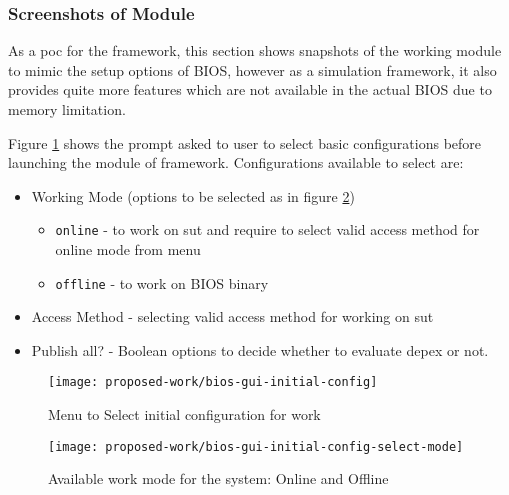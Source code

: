 \subsubsection{Screenshots of Module}
As a \gls{poc} for the framework, this section shows snapshots of the working module to mimic the setup options of BIOS, however as a simulation framework, it also provides quite more features which are not available in the actual BIOS due to memory limitation.

Figure \ref{fig:proposed-work-bios-gui-initial-config} shows the prompt asked to user to select basic configurations before launching the module of framework. Configurations available to select are:

\begin{itemize}
	\item Working Mode (options to be selected as in figure \ref{fig:proposed-work-bios-gui-initial-config-select-mode})
	\begin{itemize}
		\item \verb|online| - to work on \gls{sut} and require to select valid access method for online mode from menu
		\item \verb|offline| - to work on BIOS binary
	\end{itemize}
	\item Access Method - selecting valid access method for working on \gls{sut}
	\item Publish all? - Boolean options to decide whether to evaluate \gls{depex} or not.
\end{itemize}

\begin{figure}[!htbp]
	\centering
	\texttt{[image: proposed-work/bios-gui-initial-config]}
	\caption{Menu to Select initial configuration for work}\label{fig:proposed-work-bios-gui-initial-config}
\end{figure}

\begin{figure}[!htbp]
	\centering
	\texttt{[image: proposed-work/bios-gui-initial-config-select-mode]}
	\caption{Available work mode for the system: Online and Offline}\label{fig:proposed-work-bios-gui-initial-config-select-mode}
\end{figure}




